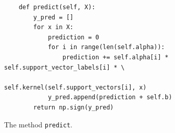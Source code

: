 \begin{figure}[!ht]
\centering
\begin{verbatim}
    def predict(self, X):
        y_pred = []
        for x in X:
            prediction = 0
            for i in range(len(self.alpha)):
                prediction += self.alpha[i] * self.support_vector_labels[i] * \
                              self.kernel(self.support_vectors[i], x)
            y_pred.append(prediction + self.b)
        return np.sign(y_pred)
\end{verbatim}
\caption{The method \texttt{predict}.}
\label{fig:svm_predict}
\end{figure}
\FloatBarrier



 
